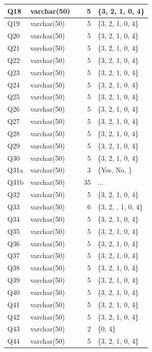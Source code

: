 \begin{landscape}
\begin{longtable}{|l|l|l|r|p{6cm}|}
\hline
Q18 & varchar(50) &  & 5 & \{3, 2, 1, 0, 4\} \\
\hline
Q19 & varchar(50) &  & 5 & \{3, 2, 1, 0, 4\} \\
\hline
Q20 & varchar(50) &  & 5 & \{3, 2, 1, 0, 4\} \\
\hline
Q21 & varchar(50) &  & 5 & \{3, 2, 1, 0, 4\} \\
\hline
Q22 & varchar(50) &  & 5 & \{3, 2, 1, 0, 4\} \\
\hline
Q23 & varchar(50) &  & 5 & \{3, 2, 1, 0, 4\} \\
\hline
Q24 & varchar(50) &  & 5 & \{3, 2, 1, 0, 4\} \\
\hline
Q25 & varchar(50) &  & 5 & \{3, 2, 1, 0, 4\} \\
\hline
Q26 & varchar(50) &  & 5 & \{3, 2, 1, 0, 4\} \\
\hline
Q27 & varchar(50) &  & 5 & \{3, 2, 1, 0, 4\} \\
\hline
Q28 & varchar(50) &  & 5 & \{3, 2, 1, 0, 4\} \\
\hline
Q29 & varchar(50) &  & 5 & \{3, 2, 1, 0, 4\} \\
\hline
Q30 & varchar(50) &  & 5 & \{3, 2, 1, 0, 4\} \\
\hline
Q31a & varchar(50) &  & 3 & \{Yes, No, \} \\
\hline
Q31b & varchar(50) &  & 35 & ... \\
\hline
Q32 & varchar(50) &  & 5 & \{3, 2, 1, 0, 4\} \\
\hline
Q33 & varchar(50) &  & 6 & \{3, 2, , 1, 0, 4\} \\
\hline
Q34 & varchar(50) &  & 5 & \{3, 2, 1, 0, 4\} \\
\hline
Q35 & varchar(50) &  & 5 & \{3, 2, 1, 0, 4\} \\
\hline
Q36 & varchar(50) &  & 5 & \{3, 2, 1, 0, 4\} \\
\hline
Q37 & varchar(50) &  & 5 & \{3, 2, 1, 0, 4\} \\
\hline
Q38 & varchar(50) &  & 5 & \{3, 2, 1, 0, 4\} \\
\hline
Q39 & varchar(50) &  & 5 & \{3, 2, 1, 0, 4\} \\
\hline
Q40 & varchar(50) &  & 5 & \{3, 2, 1, 0, 4\} \\
\hline
Q41 & varchar(50) &  & 5 & \{3, 2, 1, 0, 4\} \\
\hline
Q42 & varchar(50) &  & 5 & \{3, 2, 1, 0, 4\} \\
\hline
Q43 & varchar(50) &  & 2 & \{0, 4\} \\
\hline
Q44 & varchar(50) &  & 5 & \{3, 2, 1, 0, 4\} \\

\end{longtable}
\end{landscape}
